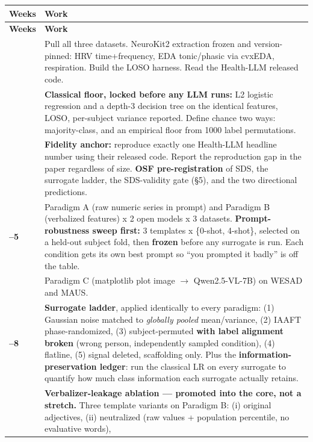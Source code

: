 \documentclass[11pt]{article}
\begin{document}
\begin{longtable}{@{}>{\bfseries\RaggedRight}p{}L{0.865\textwidth}@{}}
\toprule
\textbf{\color{Accent}Weeks} & \textbf{\color{Accent}Work}\\
\midrule
\endfirsthead
\toprule
\textbf{\color{Accent}Weeks} & \textbf{\color{Accent}Work}\\
\midrule
\endhead
\bottomrule
{} & Pull all three datasets. NeuroKit2 extraction frozen and version-pinned:
HRV time+frequency, EDA tonic/phasic via cvxEDA, respiration. Build the LOSO
harness. Read the Health-LLM released code.\\
 & \textbf{Classical floor, locked before any LLM runs:} L2 logistic
regression and a depth-3 decision tree on the identical features, LOSO,
per-subject variance reported. Define chance two ways: majority-class, and an
empirical floor from 1000 label permutations.\\
 & \textbf{Fidelity anchor:} reproduce exactly one Health-LLM headline number
using their released code. Report the reproduction gap in the paper regardless
of size. \textbf{OSF pre-registration} of SDS, the surrogate ladder, the
SDS-validity gate (\S5), and the two directional predictions.\\
--5 & Paradigm A (raw numeric series in prompt) and Paradigm B (verbalized
features) x 2 open models x 3 datasets. \textbf{Prompt-robustness sweep
first:} 3 templates x \{0-shot, 4-shot\}, selected on a held-out subject fold,
then \textbf{frozen} before any surrogate is run. Each condition gets its own
best prompt so ``you prompted it badly'' is off the table.\\
 & Paradigm C (matplotlib plot image $\rightarrow$ Qwen2.5-VL-7B) on WESAD
and MAUS.\\
--8 & \textbf{Surrogate ladder}, applied identically to every paradigm:
(1) Gaussian noise matched to \emph{globally pooled} mean/variance, (2) IAAFT
phase-randomized, (3) subject-permuted \textbf{with label alignment broken}
(wrong person, independently sampled condition), (4) flatline, (5) signal
deleted, scaffolding only. Plus the \textbf{information-preservation ledger}:
run the classical LR on every surrogate to quantify how much class information
each surrogate actually retains.\\
 & \textbf{Verbalizer-leakage ablation --- promoted into the core, not a
stretch.} Three template variants on Paradigm B: (i) original adjectives,
(ii) neutralized (raw values + population percentile, no evaluative words),

\end{longtable}
\end{document}
